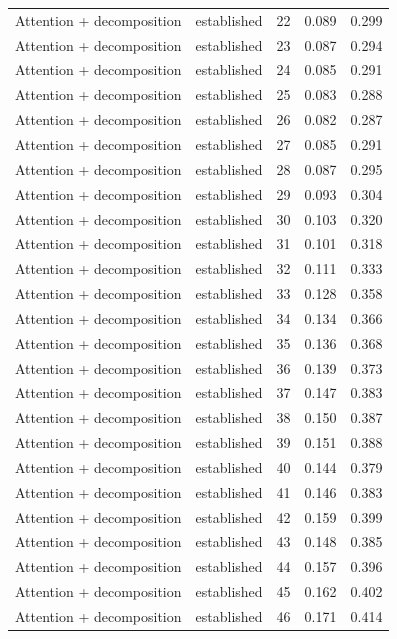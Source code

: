 \begin{tabular}{llrrr}
Attention + decomposition & established & 22 & 0.089 & 0.299 \\
Attention + decomposition & established & 23 & 0.087 & 0.294 \\
Attention + decomposition & established & 24 & 0.085 & 0.291 \\
Attention + decomposition & established & 25 & 0.083 & 0.288 \\
Attention + decomposition & established & 26 & 0.082 & 0.287 \\
Attention + decomposition & established & 27 & 0.085 & 0.291 \\
Attention + decomposition & established & 28 & 0.087 & 0.295 \\
Attention + decomposition & established & 29 & 0.093 & 0.304 \\
Attention + decomposition & established & 30 & 0.103 & 0.320 \\
Attention + decomposition & established & 31 & 0.101 & 0.318 \\
Attention + decomposition & established & 32 & 0.111 & 0.333 \\
Attention + decomposition & established & 33 & 0.128 & 0.358 \\
Attention + decomposition & established & 34 & 0.134 & 0.366 \\
Attention + decomposition & established & 35 & 0.136 & 0.368 \\
Attention + decomposition & established & 36 & 0.139 & 0.373 \\
Attention + decomposition & established & 37 & 0.147 & 0.383 \\
Attention + decomposition & established & 38 & 0.150 & 0.387 \\
Attention + decomposition & established & 39 & 0.151 & 0.388 \\
Attention + decomposition & established & 40 & 0.144 & 0.379 \\
Attention + decomposition & established & 41 & 0.146 & 0.383 \\
Attention + decomposition & established & 42 & 0.159 & 0.399 \\
Attention + decomposition & established & 43 & 0.148 & 0.385 \\
Attention + decomposition & established & 44 & 0.157 & 0.396 \\
Attention + decomposition & established & 45 & 0.162 & 0.402 \\
Attention + decomposition & established & 46 & 0.171 & 0.414 \\

\end{tabular}
